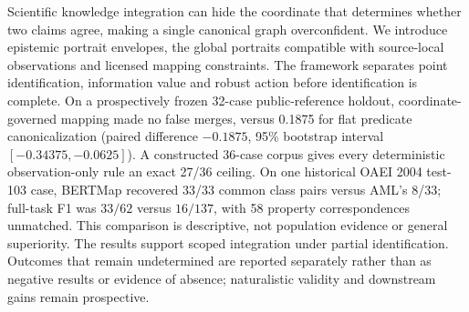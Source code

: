 Scientific knowledge integration can hide the coordinate that determines
whether two claims agree, making a single canonical graph overconfident. We
introduce epistemic portrait envelopes, the global portraits compatible with
source-local observations and licensed mapping constraints. The framework
separates point identification, information value and robust action before
identification is complete. On a prospectively frozen 32-case public-reference
holdout, coordinate-governed mapping made no false merges, versus 0.1875 for
flat predicate canonicalization (paired difference $-0.1875$, 95\% bootstrap
interval $[-0.34375,-0.0625]$). A constructed 36-case corpus gives every
deterministic observation-only rule an exact 27/36 ceiling. On one historical
OAEI 2004 test-103 case, BERTMap recovered 33/33 common class pairs versus
AML's 8/33; full-task F1 was $33/62$ versus $16/137$, with 58 property
correspondences unmatched. This comparison is descriptive, not population
evidence or general superiority. The results support scoped integration under
partial identification. Outcomes that remain undetermined are reported
separately rather than as negative results or evidence of absence;
naturalistic validity and downstream gains remain prospective.
\endinput
